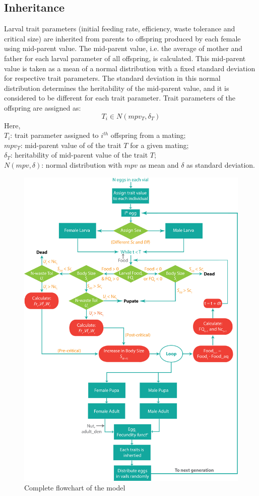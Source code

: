 \subsection{Inheritance}
Larval trait parameters (initial feeding rate, efficiency, waste tolerance and critical size) are inherited from parents to offspring produced by each female using mid-parent value. The mid-parent value, i.e. the average of mother and father for each larval parameter of all offspring, is calculated. This mid-parent value is taken as a mean of a normal distribution with a fixed standard deviation for respective trait parameters. The standard deviation in this normal distribution determines the heritability of the mid-parent value, and it is considered to be different for each trait parameter. Trait parameters of the offspring are assigned as:
\[T_{i} \in N(mpv_{T}, \delta_{T})\]
Here, \\
$T_{i}$: trait parameter assigned to $i^{th}$ offspring from a mating; \\
$mpv_{T}$: mid-parent value of of the trait $T$ for a given mating; \\
$\delta_{T}$: heritability of mid-parent value of the trait $T$; \\
$N(mpv, \delta)$: normal distribution with $mpv$ as mean and $\delta$ as standard deviation.
\begin{figure}[p]
  \centering
  \includegraphics[trim= 0 0 0 0, clip, width= \textwidth]{C4/Figs/model}
  \caption{Complete flowchart of the model }
  \label{model}
\end{figure}

